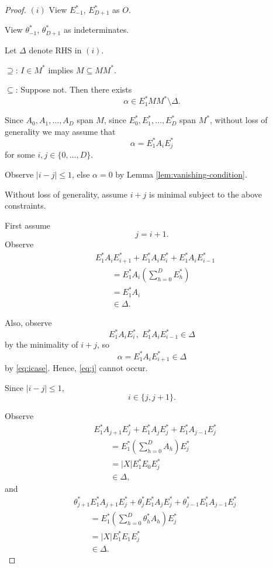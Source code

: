 \documentclass[
]{book}
\theoremstyle{definition}
\theoremstyle{definition}
\theoremstyle{definition}
\theoremstyle{definition}
\theoremstyle{remark}
\begin{document}
\begin{proof}
\leavevmode

\((i)\) View \(E^*_{-1}\), \(E^*_{D+1}\) as \(O\).

View \(\theta^*_{-1}\), \(\theta^*_{D+1}\) as indeterminates.

Let \(\Delta\) denote \(\mathrm{RHS}\) in \((i)\).

\(\supseteq\): \(I\in M^*\) implies \(M\subseteq MM^*\).

\(\subseteq\): Suppose not. Then there exists
\begin{equation}
\alpha\in E^*_1MM^*\setminus \Delta. \label{eq:alpha} 
\end{equation}

Since \(A_0, A_1, \ldots, A_D\) span \(M\), since \(E^*_0, E^*_1, \ldots, E^*_D\) span \(M^*\), without loss of generality we may assume that
\[\alpha = E^*_1A_iE^*_j\]
for some \(i,j\in \{0, \ldots, D\}\).

Observe \(|i-j|\leq 1\), else \(\alpha =0\) by Lemma \ref{lem:vanishing-condition}.

Without loss of generality, assume \(i+j\) is minimal subject to the above constraints.

First assume
\begin{equation}
j = i+1. \label{eq:j}
\end{equation}
Observe
\begin{align}
& E^*_1A_iE^*_{i+1} + E^*_1A_iE^*_i + E^*_1A_iE^*_{i-1}\\
& \qquad = E^*_1A_i\left(\sum_{h=0}^D E^*_h\right)\\
& \qquad = E^*_1A_i\\
& \qquad \in \Delta. \label{eq:icase}
\end{align}

Also, observe
\[E^*_1A_iE^*_i, \; E^*_1A_iE^*_{i-1}\in \Delta\]
by the minimality of \(i+j\), so
\[\alpha = E^*_1A_iE^*_{i+1}\in \Delta\]
by \eqref{eq:icase}. Hence, \eqref{eq:j} cannot occur.

Since \(|i-j|\leq 1\),
\begin{equation}
i\in \{j, j+1\}. \label{eq:i}
\end{equation}

Observe
\begin{align}
& E^*_1A_{j+1}E^*_{j} + E^*_1A_jE^*_j + E^*_1A_{j-1}E^*_{j}\\
& \qquad = E^*_1\left(\sum_{h=0}^D A_h\right)E^*_j\\
& \qquad = |X|E^*_1E_0E^*_j\\
& \qquad \in \Delta, \label{eq:jplus1}
\end{align}
and
\begin{align}
& \theta^*_{j+1}E^*_1A_{j+1}E^*_{j} + \theta^*_j E^*_1A_jE^*_j + \theta^*_{j-1}E^*_1A_{j-1}E^*_{j}\\
& \qquad = E^*_1\left(\sum_{h=0}^D \theta^*_h A_h\right)E^*_j\\
& \qquad = |X|E^*_1E_1E^*_j\\
& \qquad \in \Delta. \label{eq:thetajplus1}
\end{align}


\end{proof}
\end{document}
